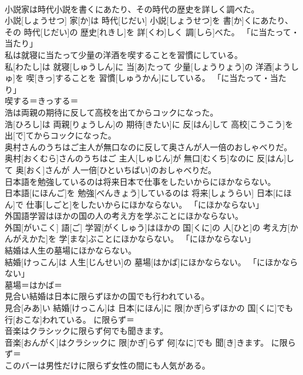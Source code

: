 \documentclass[8pt]{extreport}
\begin{document}
\begin{CJK}{UTF8}{min}
\\	小説家は時代小説を書くにあたり、その時代の歴史を詳しく調べた。	
\\	小説[しょうせつ] 家[か]は 時代[じだい] 小説[しょうせつ]を 書[か]くにあたり、その 時代[じだい]の 歴史[れきし]を 詳[くわ]しく 調[しら]べた。	「に当たって・当たり」
\\	私は就寝に当たって少量の洋酒を喫することを習慣にしている。	
\\	私[わたし]は 就寝[しゅうしん]に 当[あ]たって 少量[しょうりょう]の 洋酒[ようしゅ]を 喫[きっ]することを 習慣[しゅうかん]にしている。	「に当たって・当たり」
\\	喫する＝きっする＝ 
\\	浩は両親の期待に反して高校を出てからコックになった。	
\\	浩[ひろし]は 両親[りょうしん]の 期待[きたい]に 反[はん]して 高校[こうこう]を 出[で]てからコックになった。	
\\	奥村さんのうちはご主人が無口なのに反して奥さんが人一倍のおしゃべりだ。	
\\	奥村[おくむら]さんのうちはご 主人[しゅじん]が 無口[むくち]なのに 反[はん]して 奥[おく]さんが 人一倍[ひといちばい]のおしゃべりだ。	
\\	日本語を勉強しているのは将来日本で仕事をしたいからにほかならない。	
\\	日本語[にほんご]を 勉強[べんきょう]しているのは 将来[しょうらい] 日本[にほん]で 仕事[しごと]をしたいからにほかならない。	「にほかならない」
\\	外国語学習はほかの国の人の考え方を学ぶことにほかならない。	
\\	外国[がいこく] 語[ご] 学習[がくしゅう]はほかの 国[くに]の 人[ひと]の 考え方[かんがえかた]を 学[まな]ぶことにほかならない。	「にほかならない」
\\	結婚は人生の墓場にほかならない。	
\\	結婚[けっこん]は 人生[じんせい]の 墓場[はかば]にほかならない。	「にほかならない」
\\	墓場＝はかば＝ 
\\	見合い結婚は日本に限らずほかの国でも行われている。	
\\	見合[みあ]い 結婚[けっこん]は 日本[にほん]に 限[かぎ]らずほかの 国[くに]でも 行[おこな]われている。	に限らず＝ 
\\	音楽はクラシックに限らず何でも聞きます。	
\\	音楽[おんがく]はクラシックに 限[かぎ]らず 何[なに]でも 聞[き]きます。	に限らず＝ 
\\	このバーは男性だけに限らず女性の間にも人気がある。	

\end{CJK}
\end{document}
